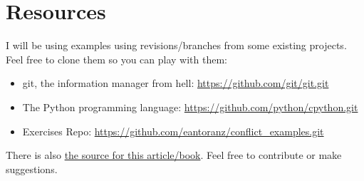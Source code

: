 
\section{Resources}

I will be using examples using revisions/branches from some existing projects. Feel free to clone them so you can play with them:

\begin{itemize}

	\item git, the information manager from hell: \url{https://github.com/git/git.git}
	\label{git_repo}

	\item The Python programming language: \url{https://github.com/python/cpython.git}
	\label{python_repo}
	
	\item Exercises Repo: \url{https://github.com/eantoranz/conflict_examples.git}
	\label{exercises_repo}

\end{itemize}

There is also \href{https://github.com/eantoranz/conflict_book.git}{the source for this article/book}.
Feel free to contribute or make suggestions.
